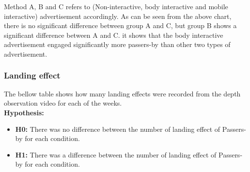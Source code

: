 \begin{table}[H]
\caption{Post-Hoc Tukey’s HSD}
\label{tab:engage-non-posthoctukey}
\centering
{}
\end{table}


Method A, B and C refers to (Non-interactive, body interactive and mobile interactive) advertisement accordingly. As can be seen from the above chart, there is no significant difference between group A and C, but group B shows a significant difference between A and C. it shows that the body interactive advertisement engaged significantly more passers-by than other two types of advertisement.


\subsubsection {Landing effect}
The bellow table shows how many landing effects were recorded from the depth observation video for each of the weeks.\\


\textbf{Hypothesis: }
\begin{itemize}
\item \textbf{H0:} There was no difference between the number of landing effect of Passers-by for each condition.
\item \textbf{H1:} There was a difference between the number of landing effect of Passers-by for each condition.
\end{itemize}

\begin{table}[H]
\caption{Number of Landing effect in three weeks}
\label{tab:landingeffectthreeweeks}
\centering
{}
\end{table}

